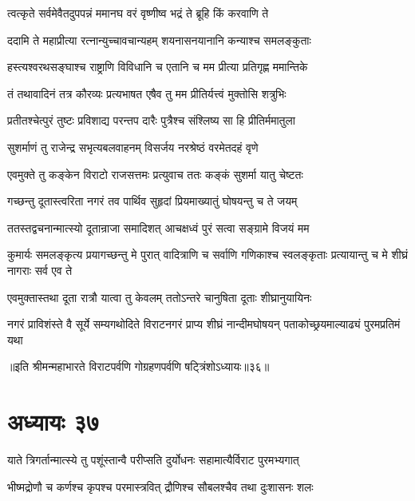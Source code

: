 \twolineshloka
{त्वत्कृते सर्वमेवैतदुपपन्नं ममानघ}
{वरं वृष्णीष्व भद्रं ते ब्रूहि किं करवाणि ते}


\twolineshloka
{ददामि ते महाप्रीत्या रत्नान्युच्चावचान्यहम्}
{शयनासनयानानि कन्याश्च समलङ्कुताः}


\twolineshloka
{हस्त्यश्वरथसङ्घाश्च राष्ट्राणि विविधानि च}
{एतानि च मम प्रीत्या प्रतिगृह्ण ममान्तिके}



\twolineshloka
{तं तथावादिनं तत्र कौरव्यः प्रत्यभाषत}
{एषैव तु मम प्रीतिर्यत्त्वं मुक्तोसि शत्रुभिः}


\twolineshloka
{प्रतीतश्चेत्पुरं तुष्टः प्रविशाद्य परन्तप}
{दारैः पुत्रैश्च संश्लिष्य सा हि प्रीतिर्ममातुला}


\twolineshloka
{सुशर्माणं तु राजेन्द्र सभृत्यबलवाहनम्}
{विसर्जय नरश्रेष्ठं वरमेतदहं वृणे}



\twolineshloka
{एवमुक्ते तु कङ्केन विराटो राजसत्तमः}
{प्रत्युवाच ततः कङ्कं सुशर्मा यातु चेष्टतः}




\twolineshloka
{गच्छन्तु दूतास्त्वरिता नगरं तव पार्थिव}
{सुहृदां प्रियमाख्यातुं घोषयन्तु च ते जयम्}


\twolineshloka
{ततस्तद्वचनान्मात्स्यो दूतान्राजा समादिशत्}
{आचक्षध्वं पुरं सत्वा सङ्ग्रामे विजयं मम}


\threelineshloka
{कुमार्यः समलङ्कृत्य प्रयागच्छन्तु मे पुरात्}
{वादित्राणि च सर्वाणि गणिकाश्च स्वलङ्कृताः}
{प्रत्यायान्तु च मे शीघ्रं नागराः सर्व एव ते}


\twolineshloka
{एवमुक्तास्तथा दूता रात्रौ यात्वा तु केवलम्}
{ततोऽन्तरे चानुषिता दूताः शीघ्रानुयायिनः}


\threelineshloka
{नगरं प्राविशंस्ते वै सूर्ये सम्यगथोदिते}
{विराटनगरं प्राप्य शीघ्रं नान्दीमघोषयन्}
{पताकोच्छ्रयमाल्याढ्यं पुरमप्रतिमं यथा}

॥इति श्रीमन्महाभारते विराटपर्वणि गोग्रहणपर्वणि षट्त्रिंशोऽध्यायः॥३६॥

\chapter{अध्यायः ३७}

\twolineshloka
{याते त्रिगर्तान्मात्स्ये तु पशूंस्तान्वै परीप्सति}
{दुर्योधनः सहामात्यैर्विराट पुरमभ्यगात्}


\twolineshloka
{भीष्मद्रोणौ च कर्णश्च कृपश्च परमास्त्रवित्}
{द्रौणिश्च सौबलश्चैव तथा दुःशासनः शलः}


